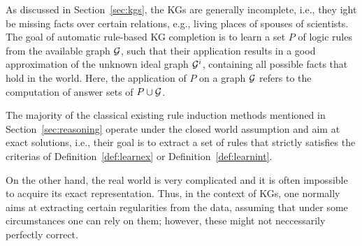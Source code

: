 

As discussed in Section~\ref{sec:kgs}, the KGs are generally incomplete, i.e., they ight be missing facts over certain relations, e.g., living places of spouses of scientists. The goal of automatic rule-based KG completion is to learn a set $P$ of logic rules from the available graph $\mathcal{G}$, such that their application results in a good approximation of the unknown ideal graph $\mathcal{G}^i$, containing all possible facts that hold in the world. Here, the application of $P$ on a graph $\mathcal{G}$ refers to the computation of answer sets of $P\cup \mathcal{G}$.

The majority of the classical existing rule induction methods mentioned in Section~\ref{sec:reasoning} operate under the closed world assumption and aim at exact solutions, i.e., their goal is to extract a set of rules that strictly satisfies the criterias of Definition~\ref{def:learnex} or Definition~\ref{def:learnint}.

On the other hand, the real world is very complicated and it is often impossible to acquire its exact representation. Thus, in the context of KGs, one normally aims at extracting certain regularities from the data, assuming that under some circumstances one can rely on them; however, these might not neccessarily perfectly correct. 

